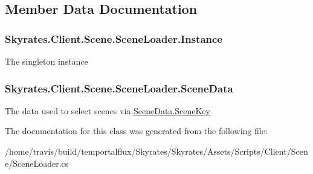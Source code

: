 \subsection{Member Data Documentation}
\hypertarget{class_skyrates_1_1_client_1_1_scene_1_1_scene_loader_a07c9c09ae6a40c74ae63acd958364206}{
\subsubsection[{Instance}]{ Skyrates.\-Client.\-Scene.\-Scene\-Loader.\-Instance\hspace{0.3cm}{\ttfamily [static]}}}\label{class_skyrates_1_1_client_1_1_scene_1_1_scene_loader_a07c9c09ae6a40c74ae63acd958364206}


The singleton instance 

\hypertarget{class_skyrates_1_1_client_1_1_scene_1_1_scene_loader_a1df3740a539b25e862afdc4eebf4a9b5}{
\subsubsection[{Scene\-Data}]{ Skyrates.\-Client.\-Scene.\-Scene\-Loader.\-Scene\-Data}}\label{class_skyrates_1_1_client_1_1_scene_1_1_scene_loader_a1df3740a539b25e862afdc4eebf4a9b5}


The data used to select scenes via \hyperlink{class_skyrates_1_1_client_1_1_scene_1_1_scene_data_a31ee71a248fd3456a7e655f71f268583}{Scene\-Data.\-Scene\-Key} 



The documentation for this class was generated from the following file\-:\begin{DoxyCompactItemize}
\item 
/home/travis/build/temportalflux/\-Skyrates/\-Skyrates/\-Assets/\-Scripts/\-Client/\-Scene/Scene\-Loader.\-cs\end{DoxyCompactItemize}
